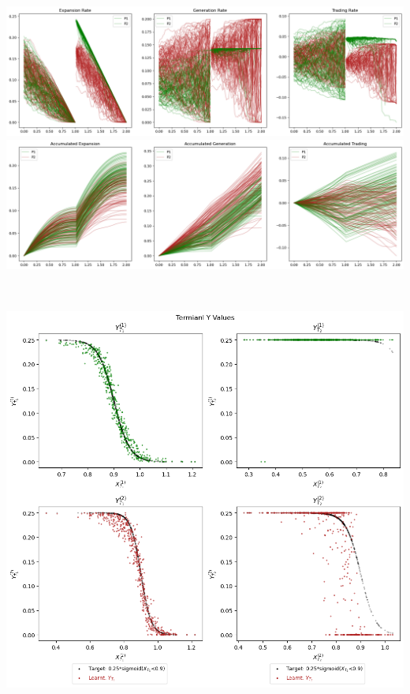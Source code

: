 \documentclass[a4paper,10pt]{article}
\newcommand{\1}{\mathbf{1}}
\begin{document}
\begin{minipage}{\textwidth}
  \centering
  \begin{minipage}[h]{0.8\textwidth}
    \centering
    \includegraphics[]{FinalReports/Illustration_diagrams/Seprt-2A2P-Sigmoid-ResExamples/Rates.png}\\
    \includegraphics[]{FinalReports/Illustration_diagrams/Seprt-2A2P-Sigmoid-ResExamples/AccumRates.png}\\
    \label{fig:decomp-gen-sep}
  \end{minipage}\\
  \vspace{20pt}
  \begin{minipage}[h]{0.65\textwidth}
    \centering
    \includegraphics[]{FinalReports/Illustration_diagrams/Seprt-2A2P-Sigmoid-ResExamples/sigmoid_target.png}\\
    \label{fig:terminal-values-sep}
  \end{minipage}\\
  \vspace{-20pt}
\end{minipage}
\end{document}
